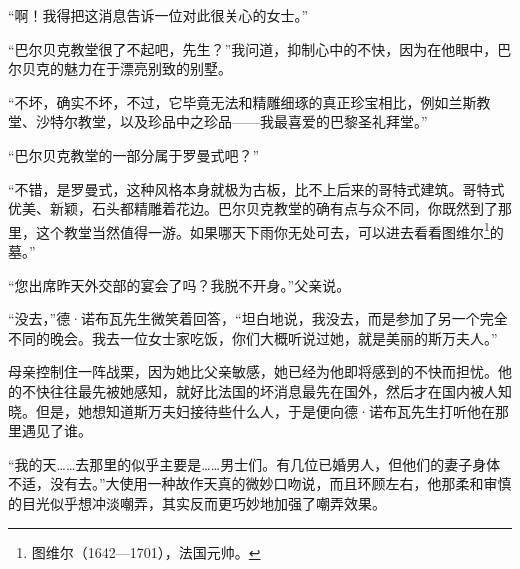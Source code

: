 \par “啊！我得把这消息告诉一位对此很关心的女士。”
\par “巴尔贝克教堂很了不起吧，先生？”我问道，抑制心中的不快，因为在他眼中，巴尔贝克的魅力在于漂亮别致的别墅。
\par “不坏，确实不坏，不过，它毕竟无法和精雕细琢的真正珍宝相比，例如兰斯教堂、沙特尔教堂，以及珍品中之珍品——我最喜爱的巴黎圣礼拜堂。”
\par “巴尔贝克教堂的一部分属于罗曼式吧？”
\par “不错，是罗曼式，这种风格本身就极为古板，比不上后来的哥特式建筑。哥特式优美、新颖，石头都精雕着花边。巴尔贝克教堂的确有点与众不同，你既然到了那里，这个教堂当然值得一游。如果哪天下雨你无处可去，可以进去看看图维尔\footnote{图维尔（1642—1701），法国元帅。}的墓。”
\par “您出席昨天外交部的宴会了吗？我脱不开身。”父亲说。
\par “没去，”德·诺布瓦先生微笑着回答，“坦白地说，我没去，而是参加了另一个完全不同的晚会。我去一位女士家吃饭，你们大概听说过她，就是美丽的斯万夫人。”
\par 母亲控制住一阵战栗，因为她比父亲敏感，她已经为他即将感到的不快而担忧。他的不快往往最先被她感知，就好比法国的坏消息最先在国外，然后才在国内被人知晓。但是，她想知道斯万夫妇接待些什么人，于是便向德·诺布瓦先生打听他在那里遇见了谁。
\par “我的天……去那里的似乎主要是……男士们。有几位已婚男人，但他们的妻子身体不适，没有去。”大使用一种故作天真的微妙口吻说，而且环顾左右，他那柔和审慎的目光似乎想冲淡嘲弄，其实反而更巧妙地加强了嘲弄效果。

